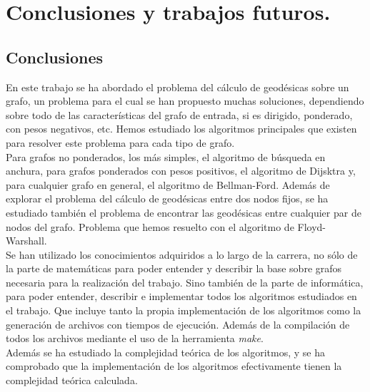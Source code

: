 
\chapter{Conclusiones y trabajos futuros.}\label{ch:sexto-capitulo}

\section{Conclusiones}

En este trabajo se ha abordado el problema del cálculo de geodésicas sobre un grafo, un problema para el cual se han propuesto muchas soluciones, dependiendo sobre todo de las características del grafo de entrada, si es dirigido, ponderado, con pesos negativos, etc. Hemos estudiado los algoritmos principales que existen para resolver este problema para cada tipo de grafo. \\

Para grafos no ponderados, los más simples, el algoritmo de búsqueda en anchura, para grafos ponderados con pesos positivos, el algoritmo de Dijsktra y, para cualquier grafo en general, el algoritmo de Bellman-Ford. Además de explorar el problema del cálculo de geodésicas entre dos nodos fijos, se ha estudiado también el problema de encontrar las geodésicas entre cualquier par de nodos del grafo. Problema que hemos resuelto con el algoritmo de Floyd-Warshall. \\

Se han utilizado los conocimientos adquiridos a lo largo de la carrera, no sólo de la parte de matemáticas para poder entender y describir la base sobre grafos necesaria para la realización del trabajo. Sino también de la parte de informática, para poder entender, describir e implementar todos los algoritmos estudiados en el trabajo. Que incluye tanto la propia implementación de los algoritmos como la generación de archivos con tiempos de ejecución. Además de la compilación de todos los archivos mediante el uso de la herramienta \textit{make}. \\

Además se ha estudiado la complejidad teórica de los algoritmos, y se ha comprobado que la implementación de los algoritmos efectivamente tienen la complejidad teórica calculada.


